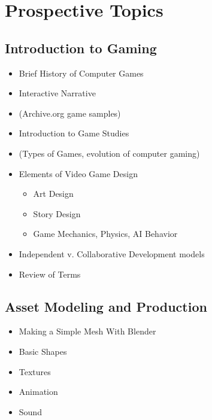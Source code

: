 \documentclass[letterpaper,10pt,english]{sphinxmanual}
\begin{document}
\section{Prospective Topics}
\label{gamedev:prospective-topics}

\subsection{Introduction to Gaming}
\label{gamedev:introduction-to-gaming}\begin{itemize}
\item {} 
Brief History of Computer Games

\item {} 
Interactive Narrative

\item {} 
(Archive.org game samples)

\item {} 
Introduction to Game Studies

\item {} 
(Types of Games, evolution of computer gaming)

\item {} 
Elements of Video Game Design
\begin{itemize}
\item {} 
Art Design

\item {} 
Story Design

\item {} 
Game Mechanics, Physics, AI Behavior

\end{itemize}

\item {} 
Independent v. Collaborative Development models

\item {} 
Review of Terms

\end{itemize}


\subsection{Asset Modeling and Production}
\label{gamedev:asset-modeling-and-production}\begin{itemize}
\item {} 
Making a Simple Mesh With Blender

\item {} 
Basic Shapes

\item {} 
Textures

\item {} 
Animation

\item {} 
Sound

\end{itemize}
\end{document}
